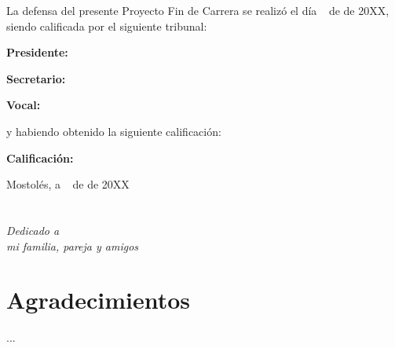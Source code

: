 \documentclass[a4paper, 12pt]{book}
\begin{document}
\vspace{1cm}
La defensa del presente Proyecto Fin de Carrera se realizó el día \qquad$\;\,$ de \qquad\qquad\qquad\qquad \newline de 20XX, siendo calificada por el siguiente tribunal:


\vspace{0.5cm}
\textbf{Presidente:}

\vspace{1.2cm}
\textbf{Secretario:}

\vspace{1.2cm}
\textbf{Vocal:}


\vspace{1.2cm}
y habiendo obtenido la siguiente calificación:

\vspace{1cm}
\textbf{Calificación:}


\vspace{1cm}
\begin{flushright}
Mostolés, a \qquad$\;\,$ de \qquad\qquad\qquad\qquad de 20XX
\end{flushright}


\chapter*{}
\begin{flushright}
\textit{Dedicado a \\
mi familia, pareja y amigos}
\end{flushright}


\chapter*{Agradecimientos}
...
\end{document}
